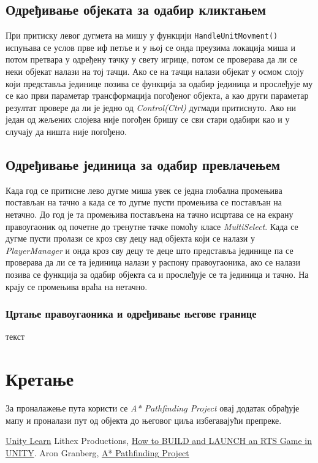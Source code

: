 \documentclass[11pt,a4paper]{report}
\begin{document}
\subsection{Одређивање објеката за одабир кликтањем}
При притиску левог дугмета на мишу у функцији \texttt{HandleUnitMovment()} испуњава се услов прве иф петље и у њој се онда преузима локација миша и потом претвара у  одређену тачку у свету игрице, потом се проверава да ли се неки објекат налази на тој тачци. Ако се на тачци налази објекат у осмом слоју који представља јединице позива се функција за одабир јединица и прослеђује му се као први параметар трансформација погођеног објекта, а као други параметар резултат провере да ли је једно од \emph{Control(Ctrl)} дугмади притиснуто. Ако ни један од жељених слојева није погођен бришу се сви стари одабири као и у случају да ништа није погођено. 

\subsection{Одређивање јединица за одабир превлачењем}
Када год се притисне лево дугме миша увек се једна глобална промењива постављан на тачно а када се то дугме пусти промењива се постављан на нетачно. До год је та промењива постављена на тачно исцртава се на екрану правоугаоник од почетне до тренутне тачке помоћу класе \emph{MultiSelect}. Када се дугме пусти пролази се кроз сву децу над објекта који се налази у \emph{PlayerManager} и онда кроз сву децу те деце што представља јединице па се проверава да ли се та јединица налази у распону правоугаоника, ако се налази позива се функција за одабир објекта са и прослеђује се та јединица и тачно. На крају се промењива враћа на нетачно.

\subsubsection{Цртање правоугаоника и одређивање његове границе}
текст 

\section{Кретање}
За проналажење пута користи се \emph{A* Pathfinding Project} овај додатак обрађује мапу и проналази пут од објекта до његовог циља избегавајући препреке.

\begin{thebibliography}{9}
\href{https://learn.unity.com/}{Unity Learn}
   Lithex Productions, \href{https://www.youtube.com/watch?v=oVM_ugro6Mw&list=PLQPhaRCbpx5U0kcamApy727XC0v1bF0PK&index=1}{How to BUILD and LAUNCH an RTS Game in UNITY}.
Aron Granberg, \href{https://arongranberg.com/astar/front}{A* Pathfinding Project}
\end{thebibliography}
\end{document}
